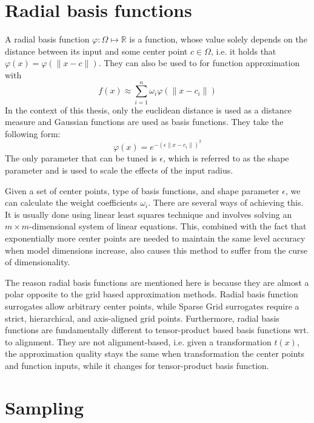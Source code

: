 \documentclass[
  a4paper,  %
  twoside,  %
  bibliography=totoc,
  headsepline,
  cleardoublepage=empty,
  parskip=half,
  draft=false
]{scrbook}
\begin{document}
\section{Radial basis functions}

A radial basis function $\varphi \colon \Omega \mapsto \mathds{R}$ is a function, whose value solely depends on the distance between its input and some center point $c \in \Omega$, i.e. it holds that $\varphi(x)=\varphi(\|x - c\|)$.
They can also be used to for function approximation with 
\begin{equation}
f(x) \approx \sum_{i=1}^n \omega_i \varphi(\|x - c_i\|)
\end{equation}
In the context of this thesis, only the euclidean distance is used as a distance measure and Gaussian functions \cite{} are used as basis functions.
They take the following form:
\begin{equation}
\varphi(x)=e^{-(\epsilon \|x - c_i\|)^2}
\end{equation}
The only parameter that can be tuned is $\epsilon$, which is referred to as the shape parameter and is used to scale the effects of the input radius.

Given a set of center points, type of basis functions, and shape parameter $\epsilon$, we can calculate the weight coefficients $\omega_i$.
There are several ways of achieving this.
It is usually done using linear least squares technique and involves solving an $m \times m$-dimensional system of linear equations.
This, combined with the fact that exponentially more center points are needed to maintain the same level accuracy when model dimensions increase, also causes this method to suffer from the curse of dimensionality.

The reason radial basis functions are mentioned here is because they are almost a polar opposite to the grid based approximation methods.
Radial basis function surrogates allow arbitrary center points, while Sparse Grid surrogates require a strict, hierarchical, and axis-aligned grid points.
Furthermore, radial basis functions are fundamentally different to tensor-product based basis functions wrt. to alignment.
They are not alignment-based, i.e. given a transformation $t(x)$, the approximation quality stays the same when transformation the center points and function inputs, while it changes for tensor-product basis function.



\section{Sampling}
\end{document}
